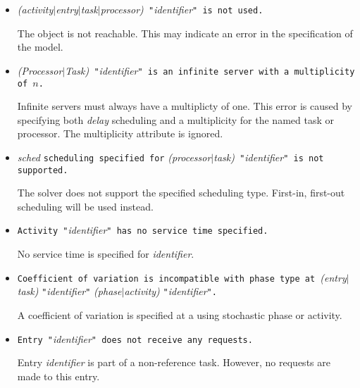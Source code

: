 \begin{itemize}
\item \emph{(activity$|$entry$|$task$|$processor)}\texttt{ "}\emph{identifier}\texttt{" is not used.}
  
  The object is not reachable.  This may
  indicate an error in the specification of the model.

\item \emph{(Processor$|$Task)}\texttt{ "}\emph{identifier}\texttt{" is an infinite server with a
  multiplicity of }$n$\texttt{.} 

  Infinite servers must always have a multiplicty of one.
  This error is caused by specifying both \emph{delay} scheduling and a multiplicity
  for the named task or processor.  The multiplicity attribute is ignored.
  
\item \emph{sched} \texttt{scheduling specified for}
  \emph{(processor$|$task)}\texttt{ "}\emph{identifier}\texttt{" is not
    supported.}
  
  The solver does not support the specified scheduling
  type.  First-in, first-out scheduling will be
  used instead.

\item \texttt{Activity "}\emph{identifier}\texttt{" has no service
    time specified.}
  
  No service time is specified for
  \emph{identifier}.

\item \texttt{Coefficient of variation is incompatible with phase type
    at }\emph{(entry$|$task)} \texttt{"}\emph{identifier}\texttt{"}
  \emph{(phase$|$activity)}
  \texttt{"}\emph{identifier}\texttt{".}
  
  A coefficient of variation is
  specified at a using stochastic phase or activity.

\item \texttt{Entry "}\emph{identifier}\texttt{" does not receive any
    requests.}
  
  Entry \emph{identifier} is part of a non-reference
  task.
  However, no requests are made to this entry.


\end{itemize}
